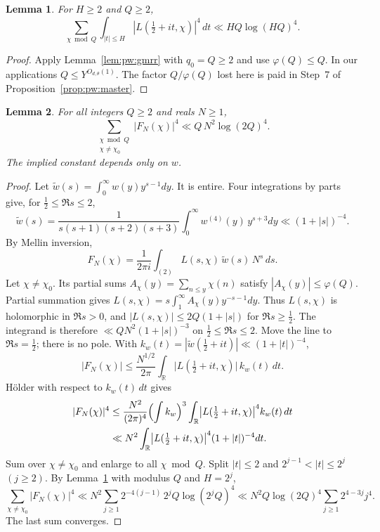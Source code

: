 \documentclass{amsart}
\newtheorem{lemma}{Lemma}[section]
\theoremstyle{definition}
\theoremstyle{plain}
\numberwithin{equation}{section}
\numberwithin{table}{section}
\begin{document}
\begin{lemma}\label{lem:pw:conductor}
For $H\ge2$ and $Q\ge2$,
\[
 \sum_{\chi\bmod Q}\int_{|t|\le H}
 |L(\tfrac12+it,\chi)|^4\,dt
 \ll HQ\log(HQ)^4.
\]
\end{lemma}

\begin{proof}
Apply Lemma~\ref{lem:pw:gmrr} with $q_0=Q\ge2$ and use
$\varphi(Q)\le Q$. In our applications $Q\le Y^{O_{d,\theta}(1)}$. The factor
$Q/\varphi(Q)$ lost here is paid in Step~7 of
Proposition~\ref{prop:pw:master}.
\end{proof}

\begin{lemma}\label{lem:pw:S4}
For all integers $Q\ge2$ and reals $N\ge1$,
\begin{equation}\label{eq:pw:S4}
 \sum_{\substack{\chi\bmod Q\\ \chi\ne\chi_0}}|F_N(\chi)|^4
 \ll Q\,N^2\log(2Q)^4 .
\end{equation}
The implied constant depends only on $w$.
\end{lemma}

\begin{proof}
Let $\widetilde w(s)=\int_0^\infty w(y)y^{s-1}dy$. It is entire. Four
integrations by parts give, for $\tfrac12\le\Re s\le2$,
\[
 \widetilde w(s)=\frac{1}{s(s+1)(s+2)(s+3)}\int_0^\infty w^{(4)}(y)\,y^{s+3}dy
 \ll(1+|s|)^{-4}.
\]
By Mellin inversion,
\[
 F_N(\chi)=\frac1{2\pi i}\int_{(2)}L(s,\chi)\,\widetilde w(s)\,N^s\,ds .
\]
Let $\chi\ne\chi_0$. Its partial sums $A_\chi(y)=\sum_{n\le y}\chi(n)$ satisfy
$|A_\chi(y)|\le\varphi(Q)$. Partial summation gives
$L(s,\chi)=s\int_1^\infty A_\chi(y)y^{-s-1}dy$. Thus $L(s,\chi)$ is
holomorphic in $\Re s>0$, and $|L(s,\chi)|\le2Q(1+|s|)$ for
$\Re s\ge\frac12$. The
integrand is therefore $\ll QN^2(1+|s|)^{-3}$ on $\tfrac12\le\Re s\le2$.
Move the line to $\Re s=\frac12$; there is no pole. With
$k_w(t)=|\widetilde w(\tfrac12+it)|\ll(1+|t|)^{-4}$,
\[
 |F_N(\chi)|\le\frac{N^{1/2}}{2\pi}\int_{\mathbb R}
 \bigl|L(\tfrac12+it,\chi)\bigr|\,k_w(t)\,dt .
\]
Hölder with respect to $k_w(t)\,dt$ gives
\[
 \begin{aligned}
 |F_N(\chi)|^4&\le\frac{N^2}{(2\pi)^4}\Bigl(\int k_w\Bigr)^3
 \int_{\mathbb R}\bigl|L(\tfrac12+it,\chi)\bigr|^4k_w(t)\,dt\\
 &\ll N^2\int_{\mathbb R}\bigl|L(\tfrac12+it,\chi)\bigr|^4(1+|t|)^{-4}dt .
 \end{aligned}
\]
Sum over $\chi\ne\chi_0$ and enlarge to all $\chi\bmod Q$. Split
$|t|\le2$ and $2^{j-1}<|t|\le2^j$ $(j\ge2)$. By
Lemma~\ref{lem:pw:conductor} with modulus $Q$ and $H=2^j$,
\[
 \sum_{\chi\ne\chi_0}|F_N(\chi)|^4
 \ll N^2\sum_{j\ge1}2^{-4(j-1)}\,2^jQ\log(2^jQ)^4
 \ll N^2Q\log(2Q)^4\sum_{j\ge1}2^{4-3j}j^4 .
\]
The last sum converges.
\end{proof}
\end{document}
